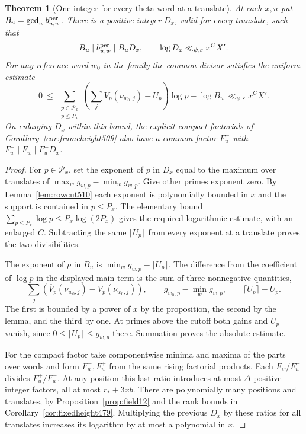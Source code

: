 \documentclass[a4paper,11pt]{article}
\newtheorem{theorem}[proposition]{Theorem}
\theoremstyle{definition}
\theoremstyle{remark}
\numberwithin{equation}{section}
\begin{document}
\begin{theorem}[One integer for every theta word at a translate]\leavevmode
\label{thm:wordgcd510}
At each \(x,u\) put \(B_u=\gcd_w b^{\rm per}_{u,w}\).
There is a positive integer \(D_x\), valid for every translate,
such that
\[
      B_u\mid b^{\rm per}_{u,w}\mid B_uD_x,\qquad
                  \log D_x\ll_{\psi,\varepsilon}x^C X'.
\]
For any reference word \(w_0\) in the family the common divisor
satisfies the uniform estimate
\[
  0\ \le\
     \sum_{\substack{p\in\mathcal P_x\\p\le P_x}}
         \left(\sum_j\overline V_p(\nu_{w_0,j})-U_p\right)\log p
         -\log B_u
               \ \ll_{\psi,\varepsilon} x^C X'.
\]
On enlarging \(D_x\) within this bound, the explicit compact
factorials of Corollary~\ref{cor:frameheight509} also have a
common factor \(F_u^-\) with \(F_u^-\mid F_w\mid F_u^-D_x\).
\end{theorem}
\begin{proof}
For \(p\in\mathcal P_x\), set the exponent of \(p\) in \(D_x\)
equal to the maximum over translates of
\(\max_w g_{w,p}-\min_w g_{w,p}\). Give other primes exponent
zero. By Lemma~\ref{lem:rowcut510} each exponent is polynomially
bounded in \(x\) and the support is contained in \(p\le P_x\).
The elementary bound \(\sum_{p\le P_x}\log p\le P_x\log(2P_x)\)
gives the required logarithmic estimate, with an enlarged \(C\).
Subtracting the same \(\lceil U_p\rceil\) from every exponent
at a translate proves the two divisibilities.

The exponent of \(p\) in \(B_u\) is
\(\min_w g_{w,p}-\lceil U_p\rceil\). The difference from the
coefficient of \(\log p\) in the displayed main term is the sum
of three nonnegative quantities,
\[
  \sum_j(\overline V_p(\nu_{w_0,j})-V_p(\nu_{w_0,j})),\qquad
   g_{w_0,p}-\min_w g_{w,p},\qquad \lceil U_p\rceil-U_p .
\]
The first is bounded by a power of \(x\) by the proposition,
the second by the lemma, and the third by one. At primes above
the cutoff both gains and \(U_p\) vanish, since
\(0\le\lceil U_p\rceil\le g_{w,p}\) there. Summation proves
the absolute estimate.

For the compact factor take componentwise minima and maxima of
the parts over words and form \(F_u^-,F_u^+\) from the same
rising factorial products. Each \(F_w/F_u^-\) divides
\(F_u^+/F_u^-\). At any position this last ratio introduces at
most \(\Delta\) positive integer factors, all at most
\(r_*+3xb\). There are polynomially many positions and
translates, by Proposition~\ref{prop:field12} and the rank
bounds in Corollary~\ref{cor:fixedheight479}. Multiplying the
previous \(D_x\) by these ratios for all translates increases
its logarithm by at most a polynomial in \(x\).
\end{proof}
\end{document}

